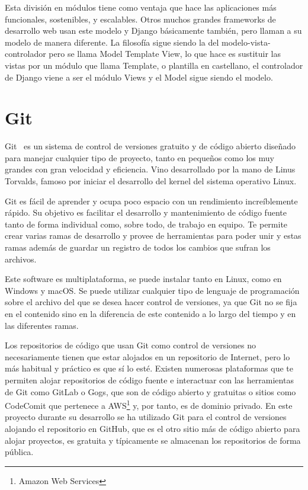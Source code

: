 \documentclass[a4paper, 12pt]{book}
\begin{document}
Esta división en módulos tiene como ventaja que hace las aplicaciones más funcionales, sostenibles, y escalables. Otros muchos grandes frameworks de desarrollo web usan este modelo y Django básicamente también, pero llaman a su modelo de manera diferente. La filosofía sigue siendo la del modelo-vista-controlador pero se llama Model Template View, lo que hace es sustituir las vistas por un módulo que llama Template, o plantilla en castellano, el controlador de Django viene a ser el módulo Views y el Model sigue siendo el modelo.

\section{Git}
\label{sec:git}
Git~\cite{git} es un sistema de control de versiones gratuito y de código abierto diseñado para manejar cualquier tipo de proyecto, tanto en pequeños como los muy grandes con gran velocidad y eficiencia. Vino desarrollado por la mano de Linus Torvalds, famoso por iniciar el desarrollo del kernel del sistema operativo Linux. 

Git es fácil de aprender y ocupa poco espacio con un rendimiento increíblemente rápido. Su objetivo es facilitar el desarrollo y mantenimiento de código fuente tanto de forma individual como, sobre todo, de trabajo en equipo. Te permite crear varias ramas de desarrollo y provee de herramientas para poder unir y estas ramas además de guardar un registro de todos los cambios que sufran los archivos. 

Este software es multiplataforma, se puede instalar tanto en Linux, como en Windows y macOS. Se puede utilizar cualquier tipo de lenguaje de programación sobre el archivo del que se desea hacer control de versiones, ya que Git no se fija en el contenido sino en la diferencia de este contenido a lo largo del tiempo y en las diferentes ramas. 

Los repositorios de código que usan Git como control de versiones no necesariamente tienen que estar alojados en un repositorio de Internet, pero lo más habitual y práctico es que sí lo esté. Existen numerosas plataformas que te permiten alojar repositorios de código fuente e interactuar con las herramientas de Git como GitLab o Gogs, que son de código abierto y gratuitas o sitios como CodeComit que pertenece a AWS\footnote{Amazon Web Services} y, por tanto, es de dominio privado. En este proyecto durante su desarrollo se ha utilizado Git para el control de versiones alojando el repositorio en GitHub, que es el otro sitio más de código abierto para alojar proyectos, es gratuita y típicamente se almacenan los repositorios de forma pública.
\end{document}
